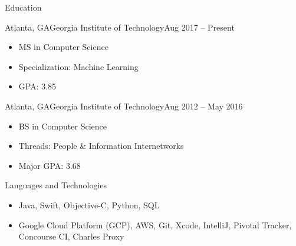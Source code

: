 \documentclass[]{mcdowellcv}
\begin{document}
	\makeheader
	
	\begin{cvsection}{Education}
		\begin{cvsubsection}{Atlanta, GA}{Georgia Institute of Technology}{Aug 2017 -- Present}
			\begin{itemize}
				\item MS in Computer Science
				\item Specialization: Machine Learning
				\item GPA: 3.85
			\end{itemize}
		\end{cvsubsection}
		\begin{cvsubsection}{Atlanta, GA}{Georgia Institute of Technology}{Aug 2012 -- May 2016}
			\begin{itemize}
				\item BS in Computer Science
				\item Threads: People \& Information Internetworks
				\item Major GPA: 3.68
			\end{itemize}
		\end{cvsubsection}
	\end{cvsection}

	\begin{cvsection}{Languages and Technologies}
		\begin{cvsubsection}{}{}{}	
			\begin{itemize}
				\item Java, Swift, Objective-C, Python, SQL
				\item Google Cloud Platform (GCP), AWS, Git, Xcode, IntelliJ, Pivotal Tracker, Concourse CI, Charles Proxy
			\end{itemize}
		\end{cvsubsection}
	\end{cvsection}
	
\end{document}
